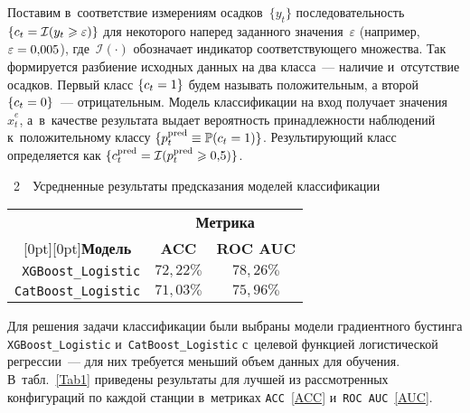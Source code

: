 \begin{multicols}{2}
Поставим в~соответствие измерениям осадков~$\{y_t\}$ последовательность 
$\{ c_t \hm=\mathcal {I} (y_t\hm\geqslant \varepsilon)\}$ 
для\linebreak
 некоторого наперед заданного значения~$\varepsilon$ (например,
 $\varepsilon \hm= 0{,}005$), где~$\mathcal {I}(\cdot)$ обозначает индикатор 
 соответствующего множества. Так формируется разби\-ение исходных данных на 
 два класса~--- наличие и~отсутствие осадков. Первый класс $\{ c_t \hm= 1\}$ 
 будем называть положительным, а второй $\{c_t \hm= 0\}$~--- отрицательным. 
 Модель классификации на вход получает значения~$\hat{x}^e_t$, а~в~качестве 
 результата выдает вероятность принадлежности наблюдений к~положительному 
 классу $\{p^{\mathrm{pred}}_t \hm\equiv \mathbb P(c_t \hm= 1)\}$. 
 Результирующий класс определяется как $\{ c^{\mathrm{pred}}_t \hm=\mathcal {I}
  (p^{\mathrm{pred}}_t
 \hm\geqslant 0{,}5)\}$.
 
 
\noindent
{{\tablename~2}\ \ \small{Усредненные результаты предсказания моделей классификации}}

{\small
\begin{center}
\tabcolsep=13pt
\begin{tabular}{|r|c|c|}
\hline
& \multicolumn{2}{c|}{\bf Метрика}\\
\cline{2-3} %
\multicolumn{1}{|c|}{{\raisebox{6pt}[0pt][0pt]{{\bf Модель}}}} &
{\bf ACC}&   {\bf ROC AUC}\\
\hline
\verb"XGBoost_Logistic"  &  $72{,}22\%$ &  $78{,}26\%$ \\
\verb"CatBoost_Logistic" &  $71{,}03\%$ &  $75{,}96\%$ \\
\hline
\end{tabular}
\end{center}
}

\addtocounter{table}{1}

\vspace*{12pt}

Для решения задачи классификации были выбраны модели градиентного 
бустинга \verb"XGBoost_Logistic" и~\verb"CatBoost_Logistic" с~целевой функцией 
логистической регрессии~--- для них требуется меньший объем данных для обучения. 
В~табл.~\ref{Tab1} приведены результаты для лучшей из рассмотренных конфигураций 
по каждой станции в~метриках \verb"ACC"~\eqref{ACC} и~\verb"ROC AUC"~\eqref{AUC}. 


\end{multicols}

